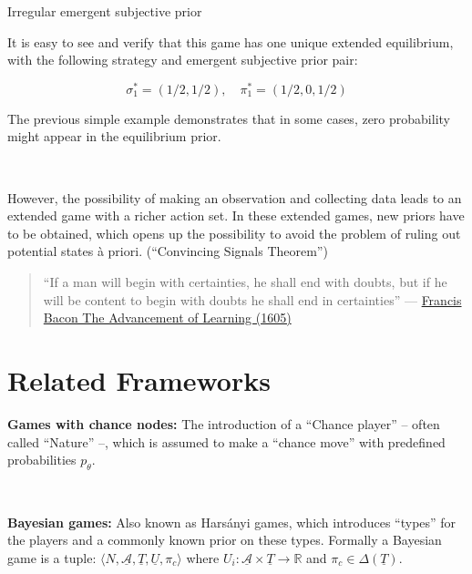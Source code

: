 \documentclass{beamer}
\theoremstyle{definition}
\begin{document}
\begin{frame}{Irregular emergent subjective prior}

    It is easy to see and verify that this game has one unique extended equilibrium, with the following strategy and emergent subjective prior pair:

    \begin{equation}
        \sigma_1^* = (1/2,1/2), \quad \pi_1^* = (1/2, 0, 1/2)
    \end{equation}

    The previous simple example demonstrates that in some cases, zero probability might appear in the equilibrium prior.

    \
    
    However, the possibility of making an observation and collecting data leads to an extended game with a richer action set. In these extended games, new priors have to be obtained, which opens up the possibility to avoid the problem of ruling out potential states à priori. (``Convincing Signals Theorem'')

\end{frame}

\begin{frame}{}

\begin{quote}
    ``If a man will begin with certainties, he shall end with doubts, but if he will be content to begin with doubts he shall end in certainties'' --- \href{https://www.oxfordreference.com/display/10.1093/acref/9780191826719.001.0001/q-oro-ed4-00003780}{Francis Bacon The Advancement of Learning (1605)}
\end{quote}
    
\end{frame}

\section{Related Frameworks}

\begin{frame}{}

{\bf Games with chance nodes:}
The introduction of a
``Chance player'' -- often called ``Nature'' --, which is assumed to make a ``chance move'' with predefined probabilities $p_\theta$.

\

{\bf Bayesian games:}
Also known as Harsányi games, which introduces ``types'' for the players and a commonly known prior on these types. Formally a Bayesian game is a tuple: $\langle N, \underline{\mathcal{A}}, \underline{T}, \underline{U}, \pi_c \rangle$ where $U_i : \underline{\mathcal{A}} \times \underline{T} \to \mathbb{R}$ and $\pi_c \in \Delta(\underline{T})$.
    
\end{frame}
\end{document}
